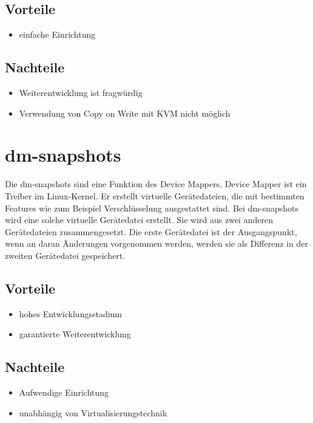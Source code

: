 \subsection{Vorteile}
\begin{itemize}
 \item einfache Einrichtung
\end{itemize}

\subsection{Nachteile}
\begin{itemize}
 \item Weiterentwicklung ist fragwürdig
 \item Verwendung von Copy on Write mit KVM nicht möglich
\end{itemize}

\section{dm-snapshots}
Die dm-snapshots sind eine Funktion des Device Mappers. Device Mapper ist ein Treiber im Linux-Kernel. Er erstellt virtuelle Gerätedateien, die mit bestimmten Features wie zum Beispiel Verschlüsselung ausgestattet sind. Bei dm-snapshots wird eine solche virtuelle Gerätedatei erstellt. Sie wird aus zwei anderen Gerätedateien zusammengesetzt. Die erste Gerätedatei ist der Ausgangspunkt, wenn an daran Änderungen vorgenommen werden, werden sie als Differenz in der zweiten Gerätedatei gespeichert. \cite{dmmbroz} \cite{dmkerneldoc}

\subsection{Vorteile}
\begin{itemize}
 \item hohes Entwicklungsstadium
 \item garantierte Weiterentwicklung
\end{itemize}

\subsection{Nachteile}
\begin{itemize}
 \item Aufwendige Einrichtung
 \item unabhängig von Virtualisierungstechnik
\end{itemize}

